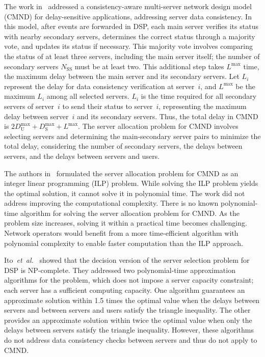 \documentclass[10pt, letterpaper]{IEEEtran}
\begin{document}
\begin{CJK}{UTF8}{ipxm}
The work in~\cite{KawabataICC2023,CMND} addressed a consistency-aware multi-server network design model (CMND) for delay-sensitive applications, addressing server data consistency.
In this model, after events are forwarded in DSP, each main server verifies its status with nearby secondary servers, determines the correct status through a majority vote, and updates its status if necessary.
This majority vote involves comparing the status of at least three servers, including the main server itself; the number of secondary servers $N_{\mathrm{SS}}$ must be at least two.
This additional step takes $L^{\max}$ time, the maximum delay between the main server and its secondary servers.
Let $L_i$ represent the delay for data consistency verification at server~$i$, and $L^{\max}$ be the maximum $L_i$ among all selected servers.
$L_i$ is the time required for all secondary servers of server~$i$ to send their status to server~$i$, representing the maximum delay between server~$i$ and its secondary servers.
Thus, the total delay in CMND is $2D_\mathrm{U}^{\max} + D_\mathrm{S}^{\max} + L^{\max}$.
The server allocation problem for CMND involves selecting servers and determining the main-secondary server pairs to minimize the total delay, considering the number of secondary servers, the delays between servers, and the delays between servers and users.

The authors in~\cite{KawabataICC2023,CMND} formulated the server allocation problem for CMND as an integer linear programming (ILP) problem. 
While solving the ILP problem yields the optimal solution, it cannot solve it in polynomial time.
The work did not address improving the computational complexity. 
There is no known polynomial-time algorithm for solving the server allocation problem for CMND. 
As the problem size increases, solving it within a practical time becomes challenging. 
Network operators would benefit from a more time-efficient algorithm with polynomial complexity to enable faster computation than the ILP approach.

Ito~{\it et~al.}~\cite{3Ito2018} showed that the decision version of the server selection problem for DSP is NP-complete.
They addressed two polynomial-time approximation algorithms for the problem, which does not impose a server capacity constraint; each server has a sufficient computing capacity.
One algorithm guarantees an approximate solution within 1.5 times the optimal value when the delays between servers and between servers and users satisfy the triangle inequality.
The other provides an approximate solution within twice the optimal value when only the delays between servers satisfy the triangle inequality. However, these algorithms do not address data consistency checks between servers and thus do not apply to CMND.


\end{CJK}
\end{document}
